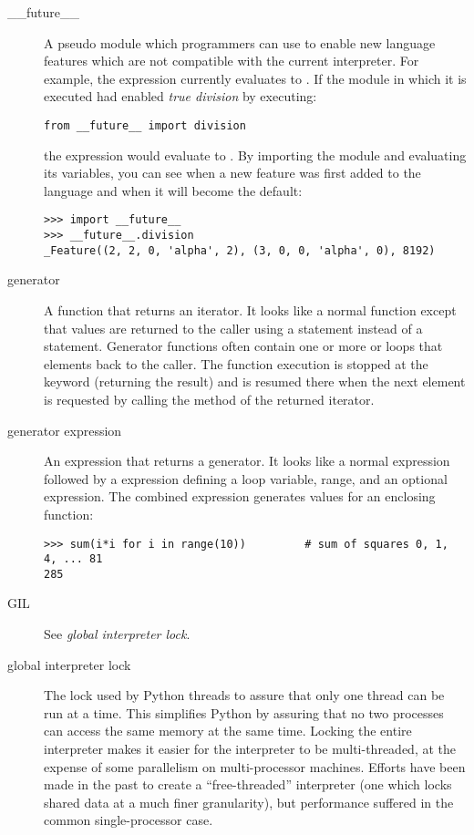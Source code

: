 \begin{description}
\item[__future__]
A pseudo module which programmers can use to enable new language
features which are not compatible with the current interpreter.  For
example, the expression  currently evaluates to .
If the module in which it is executed had enabled \emph{true division}
by executing:

\begin{verbatim}
from __future__ import division
\end{verbatim}

the expression  would evaluate to .  By
importing the 
module and evaluating its variables, you can see when a new feature
was first added to the language and when it will become the default:

\begin{verbatim}
>>> import __future__
>>> __future__.division
_Feature((2, 2, 0, 'alpha', 2), (3, 0, 0, 'alpha', 0), 8192)
\end{verbatim}

\item[generator]
A function that returns an iterator.  It looks like a normal function except
that values are returned to the caller using a  statement
instead of a {} statement.  Generator functions often
contain one or more {} or  loops that
 elements back to the caller.  The function execution is
stopped at the {} keyword (returning the result) and is
resumed there when the next element is requested by calling the
 method of the returned iterator.

\item[generator expression]
An expression that returns a generator.  It looks like a normal expression
followed by a  expression defining a loop variable, range, and
an optional  expression.  The combined expression generates
values for an enclosing function:

\begin{verbatim}
>>> sum(i*i for i in range(10))         # sum of squares 0, 1, 4, ... 81
285
\end{verbatim}

\item[GIL]
See \emph{global interpreter lock}.

\item[global interpreter lock]
The lock used by Python threads to assure that only one thread can be
run at a time.  This simplifies Python by assuring that no two
processes can access the same memory at the same time.  Locking the
entire interpreter makes it easier for the interpreter to be
multi-threaded, at the expense of some parallelism on multi-processor
machines.  Efforts have been made in the past to create a
``free-threaded'' interpreter (one which locks shared data at a much
finer granularity), but performance suffered in the common
single-processor case.


\end{description}
